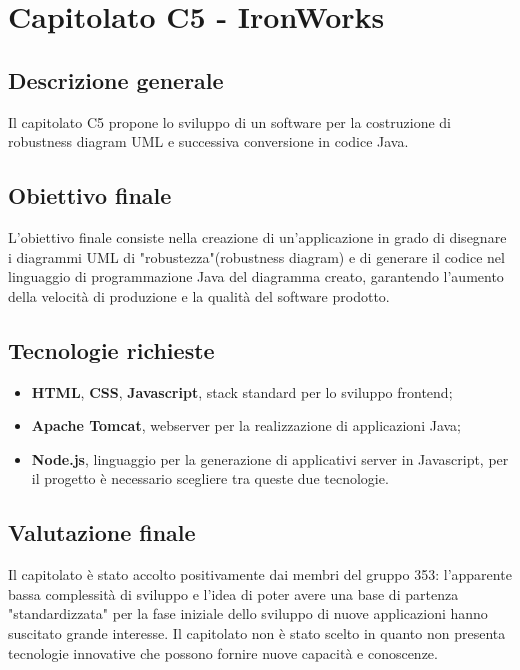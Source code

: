 \documentclass[StudioDiFattibilità.tex]{subfiles}
\begin{document}
\chapter{Capitolato C5 - IronWorks}
\section{Descrizione generale}
Il capitolato C5 propone lo sviluppo di un software
per la costruzione di robustness diagram UML e successiva conversione in codice Java.
\section{Obiettivo finale}
L'obiettivo finale consiste nella creazione di un'applicazione in grado di disegnare i diagrammi UML di "robustezza"(robustness diagram) e di generare il codice nel linguaggio di programmazione Java del diagramma creato, garantendo l'aumento della velocità di produzione e la qualità del software prodotto.
\section{Tecnologie richieste}
\begin{itemize}
	\item \textbf{HTML}, \textbf{CSS}, \textbf{Javascript}, stack standard per lo sviluppo frontend;
	\item \textbf{Apache Tomcat}, webserver per la realizzazione di applicazioni Java;
	\item \textbf{Node.js}, linguaggio per la generazione di applicativi server in Javascript, per il progetto è necessario scegliere tra queste due tecnologie.
\end{itemize}
\section{Valutazione finale}
Il capitolato è stato accolto positivamente dai membri del gruppo 353: l'apparente bassa complessità di sviluppo e l'idea di poter avere una base di partenza "standardizzata" per la fase iniziale dello sviluppo di nuove applicazioni hanno suscitato grande interesse. Il capitolato non è stato scelto in quanto non presenta tecnologie innovative che possono fornire nuove capacità e conoscenze.
\end{document}

